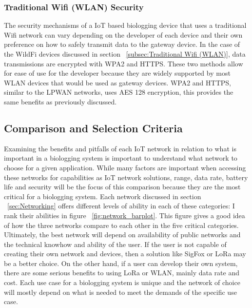 \documentclass[sigplan,screen,nonacm]{acmart}
\begin{document}
\subsubsection{Traditional Wifi (WLAN) Security}
\label{subsec:Traditional Wifi (WLAN) Security}

The security mechanisms of a IoT based biologging device that uses a traditional Wifi network can vary 
depending on the developer of each device and their own preference on how to safely transmit data to the gateway 
device. In the case of the WildFi devices discussed in section ~\ref{subsec:Traditional Wifi (WLAN)}, data 
transmissions are encrypted with WPA2 and HTTPS\cite{wild2023internet}. These two methods allow for ease of 
use for the developer because they are widely supported by most WLAN devices that would be used as gateway 
devices. WPA2 and HTTPS, similar to the LPWAN networks, uses AES 128 encryption, this provides the same 
benefits as previously discussed\cite{WPA2Moissinac}. 

\subsection{Comparison and Selection Criteria}
\label{subsec:Protocol Comparison and Selection Criteria}

Examining the benefits and pitfalls of each IoT network in relation to what is important in a biologging 
system is important to understand what network to choose for a given application. While many factors are 
important when accessing these networks for capabilities as IoT network solutions, range, data rate, battery 
life and security will be the focus of this comparison because they are the most critical for a biologging 
system. Each network discussed in section ~\ref{sec:Networking} offers different levels of ability in each 
of these categories: I rank their abilities in figure ~\ref{fig:network_barplot}. This figure gives a good 
idea of how the three networks compare to each other in the five critical categories. Ultimately, the best 
network will depend on availability of public networks and the technical knowhow and ability of the user. 
If the user is not capable of creating their own network and devices, then a solution like SigFox or LoRa 
may be a better choice. On the other hand, if a user can develop their own system, there are some serious 
benefits to using LoRa or WLAN, mainly data rate and cost. Each use case for a biologging system is 
unique and the network of choice will mostly depend on what is needed to meet the demands of the specific 
use case.
\end{document}
